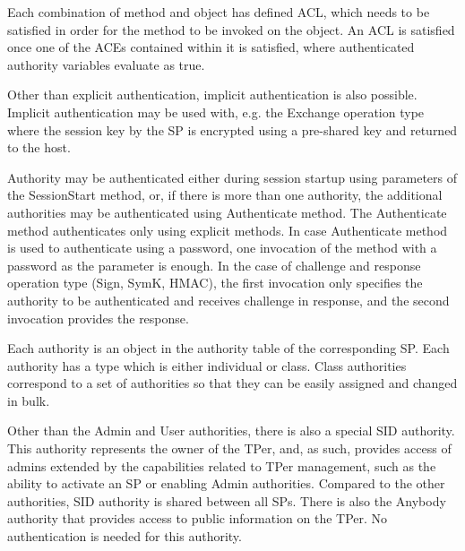 Each combination of method and object has defined ACL, which needs to be satisfied in order for the method to be invoked on the object. An ACL is satisfied once one of the ACEs contained within it is satisfied, where authenticated authority variables evaluate as true.




Other than explicit authentication, implicit authentication is also possible. Implicit authentication may be used with, e.g. the Exchange operation type where the session key by the SP is encrypted using a pre-shared key and returned to the host.


Authority may be authenticated either during session startup using parameters of the SessionStart method, or, if there is more than one authority, the additional authorities may be authenticated using Authenticate method. 
The Authenticate method authenticates only using explicit methods. 
In case Authenticate method is used to authenticate using a password, one invocation of the method with a password as the parameter is enough. In the case of challenge and response operation type (Sign, SymK, HMAC), the first invocation only specifies the authority to be authenticated and receives challenge in response, and the second invocation provides the response.


Each authority is an object in the authority table of the corresponding SP.
Each authority has a type which is either individual or class. Class authorities correspond to a set of authorities so that they can be easily assigned and changed in bulk.

Other than the Admin and User authorities, there is also a special SID authority. This authority represents the owner of the TPer, and, as such, provides access of admins extended by the capabilities related to TPer management, such as the ability to activate an SP or enabling Admin authorities. Compared to the other authorities, SID authority is shared between all SPs.
There is also the Anybody authority that provides access to public information on the TPer. No authentication is needed for this authority.

